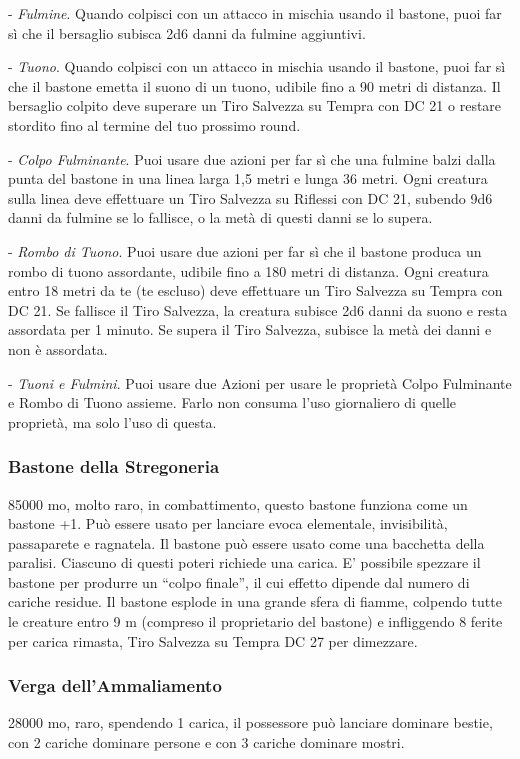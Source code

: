 \begin{multicols}{2}
- \textit{Fulmine}. Quando colpisci con un attacco in mischia usando il bastone, puoi far sì che il bersaglio subisca 2d6 danni da fulmine aggiuntivi.

- \textit{Tuono}. Quando colpisci con un attacco in mischia usando il bastone, puoi far sì che il bastone emetta il suono di un tuono, udibile fino a 90 metri di distanza. Il bersaglio colpito deve superare un Tiro Salvezza su Tempra con DC 21 o restare stordito fino al termine del tuo prossimo round.

- \textit{Colpo Fulminante}. Puoi usare due azioni per far sì che una fulmine balzi dalla punta del bastone in una linea larga 1,5 metri e lunga 36 metri. Ogni creatura sulla linea deve effettuare un Tiro Salvezza su Riflessi con DC 21, subendo 9d6 danni da fulmine se lo fallisce, o la metà di questi danni se lo supera.

- \textit{Rombo di Tuono}. Puoi usare due azioni per far sì che il bastone produca un rombo di tuono assordante, udibile fino a 180 metri di distanza. Ogni creatura entro 18 metri da te (te escluso) deve effettuare un Tiro Salvezza su Tempra con DC 21. Se fallisce il Tiro Salvezza, la creatura subisce 2d6 danni da suono e resta assordata per 1 minuto. Se supera il Tiro Salvezza, subisce la metà dei danni e non è assordata.

- \textit{Tuoni e Fulmini}. Puoi usare due Azioni per usare le proprietà Colpo Fulminante e Rombo di Tuono assieme. Farlo non consuma l'uso giornaliero di quelle proprietà, ma solo l'uso di questa.

\subsubsection*{Bastone della Stregoneria}
85000 mo, molto raro, in combattimento, questo bastone funziona come un bastone +1. Può essere usato per lanciare evoca elementale, invisibilità, passaparete e ragnatela. Il bastone può essere usato come una bacchetta della paralisi. Ciascuno di questi poteri richiede una carica. E' possibile spezzare il bastone per produrre un “colpo finale”, il cui effetto dipende dal numero di cariche residue. Il bastone esplode in una grande sfera di fiamme, colpendo tutte le creature entro 9 m (compreso il proprietario del bastone) e infliggendo 8 ferite per carica rimasta, Tiro Salvezza su Tempra DC 27 per dimezzare.

\subsubsection*{Verga dell'Ammaliamento}
28000 mo, raro, spendendo 1 carica, il possessore può lanciare dominare bestie, con 2 cariche dominare persone e con 3 cariche dominare mostri.


\end{multicols}
